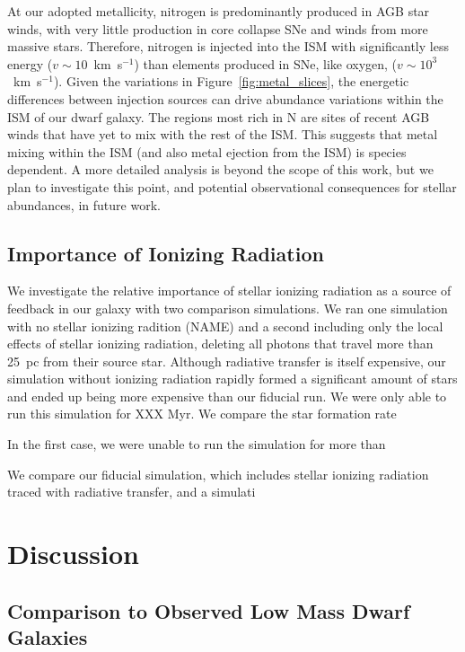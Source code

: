 \documentclass[fleqn,usenatbib,useAMS]{mnras}
\begin{document}
At our adopted metallicity, nitrogen is predominantly produced in AGB star winds, with very little production in core collapse SNe and winds from more massive stars. Therefore, nitrogen is injected into the ISM with significantly less energy ($v \sim 10$~km~s$^{-1}$) than elements produced in SNe, like oxygen, ($v\sim 10^3$~km~s$^{-1}$). Given the variations in Figure~\ref{fig:metal_slices}, the energetic differences between injection sources can drive abundance variations within the ISM of our dwarf galaxy. The regions most rich in N are sites of recent AGB winds that have yet to mix with the rest of the ISM. This suggests that metal mixing within the ISM (and also metal ejection from the ISM) is species dependent. A more detailed analysis is beyond the scope of this work, but we plan to investigate this point, and potential observational consequences for stellar abundances, in future work.  

\subsection{Importance of Ionizing Radiation}
\label{sec:ionizing radiation}

We investigate the relative importance of stellar ionizing radiation as a source of feedback in our galaxy with two comparison simulations. We ran one simulation with no stellar ionizing radition (NAME) and a second including only the local effects of stellar ionizing radiation, deleting all photons that travel more than 25~pc from their source star. Although radiative transfer is itself expensive, our simulation without ionizing radiation rapidly formed a significant amount of stars and ended up being more expensive than our fiducial run. We were only able to run this simulation for XXX Myr. We compare the star formation rate

In the first case, we were unable to run the simulation for more than  

We compare our fiducial simulation, which includes stellar ionizing radiation traced with radiative transfer, and a simulati

\section{Discussion}
\label{sec:discussion}

\subsection{Comparison to Observed Low Mass Dwarf Galaxies}
\label{sec:observation}
\end{document}
